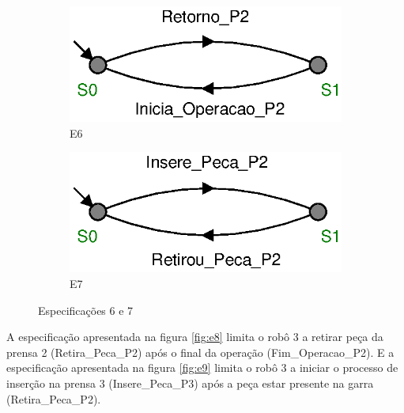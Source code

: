 \begin{figure}[H]%
  \centering
  \begin{subfigure}{0.45\textwidth}
      \centering
      \includegraphics[width=\textwidth]{imagens/E6.eps}
      \caption{E6}
      \label{fig:e6}
  \end{subfigure}
  \hfill
  \begin{subfigure}{0.45\textwidth}
      \centering
      \includegraphics[width=\textwidth]{imagens/E7.eps}
      \caption{E7}
      \label{fig:e7}
  \end{subfigure}
  \caption{Especificações 6 e 7}
  \label{fig:e67}
\end{figure}

A especificação apresentada na figura \ref{fig:e8} limita o robô 3 a retirar peça da prensa 2 (Retira\_Peca\_P2) após o final da operação (Fim\_Operacao\_P2). E a especificação apresentada na figura \ref{fig:e9} limita o robô 3 a iniciar o processo de inserção na prensa 3 (Insere\_Peca\_P3) após a peça estar presente na garra (Retira\_Peca\_P2).

